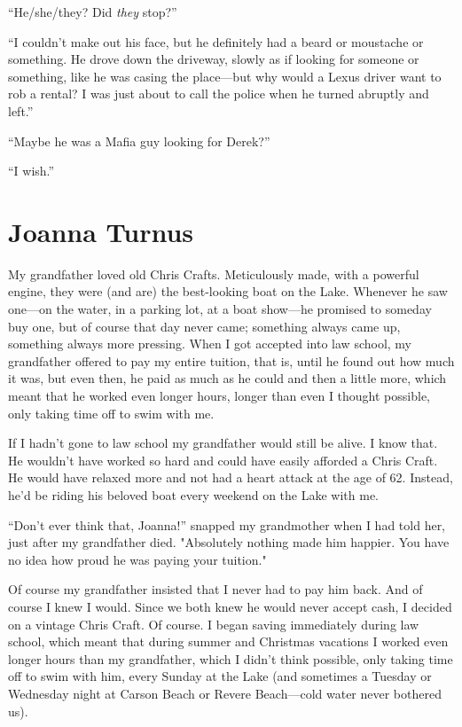 ``He/she/they? Did \emph{they} stop?''

``I couldn't make out his face, but he definitely had a beard or
moustache or something. He drove down the driveway, slowly as if looking
for someone or something, like he was casing the place---but why would a
Lexus driver want to rob a rental? I was just about to call the police
when he turned abruptly and left.''

``Maybe he was a Mafia guy looking for Derek?''

``I wish.''

\chapter{Joanna Turnus}

\titlemark

My grandfather loved old Chris Crafts. Meticulously made, with a
powerful engine, they were (and are) the best-looking boat on the Lake.
Whenever he saw one---on the water, in a parking lot, at a boat
show---he promised to someday buy one, but of course that day never
came; something always came up, something always more pressing. When I
got accepted into law school, my grandfather offered to pay my entire
tuition, that is, until he found out how much it was, but even then, he
paid as much as he could and then a little more, which meant that he
worked even longer hours, longer than even I thought possible, only
taking time off to swim with me.

If I hadn't gone to law school my grandfather would still be alive. I
know that. He wouldn't have worked so hard and could have easily
afforded a Chris Craft. He would have relaxed more and not had a heart
attack at the age of 62. Instead, he'd be riding his beloved boat every
weekend on the Lake with me.

``Don't ever think that, Joanna!'' snapped my grandmother when I had
told her, just after my grandfather died. "Absolutely nothing made him
happier. You have no idea how proud he was paying your tuition."

Of course my grandfather insisted that I never had to pay him back. And
of course I knew I would. Since we both knew he would never accept cash,
I decided on a vintage Chris Craft. Of course. I began saving
immediately during law school, which meant that during summer and
Christmas vacations I worked even longer hours than my grandfather,
which I didn't think possible, only taking time off to swim with him,
every Sunday at the Lake (and sometimes a Tuesday or Wednesday night at
Carson Beach or Revere Beach---cold water never bothered us).

